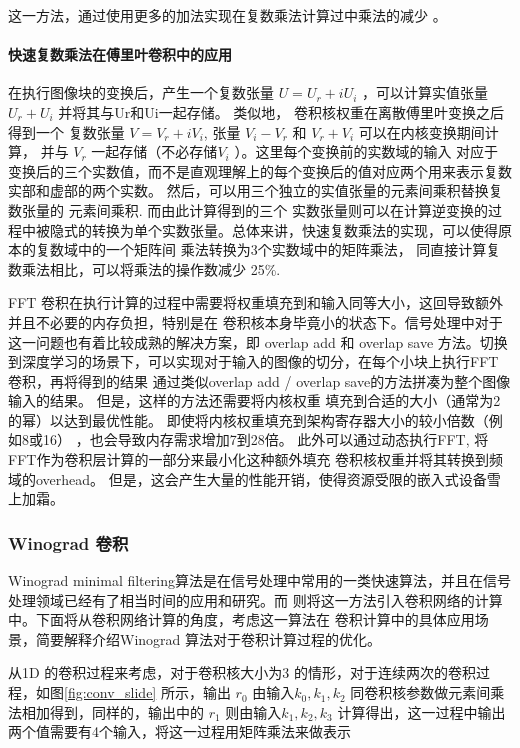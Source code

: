 这一方法，通过使用更多的加法实现在复数乘法计算过中乘法的减少 。

\paragraph{快速复数乘法在傅里叶卷积中的应用}

在执行图像块的变换后，产生一个复数张量 $U = U_r + i U_i$ ，可以计算实值张量 $U_r + U_i$ 并将其与Ur和Ui一起存储。 类似地， 卷积核权重在离散傅里叶变换之后得到一个
复数张量 $V = V_r + i V_i $, 张量 $V_i - V_r$ 和 $V_r + V_i$ 可以在内核变换期间计算， 并与 $V_r$ 一起存储（不必存储$V_i$ ）。这里每个变换前的实数域的输入
对应于变换后的三个实数值，而不是直观理解上的每个变换后的值对应两个用来表示复数实部和虚部的两个实数。 然后，可以用三个独立的实值张量的元素间乘积替换复数张量的
元素间乘积. 而由此计算得到的三个 实数张量则可以在计算逆变换的过程中被隐式的转换为单个实数张量。总体来讲，快速复数乘法的实现，可以使得原本的复数域中的一个矩阵间
乘法转换为3个实数域中的矩阵乘法， 同直接计算复数乘法相比，可以将乘法的操作数减少 25\%.

FFT 卷积在执行计算的过程中需要将权重填充到和输入同等大小，这回导致额外并且不必要的内存负担，特别是在
卷积核本身毕竟小的状态下。信号处理中对于这一问题也有着比较成熟的解决方案，即 overlap add 和 overlap save
方法。切换到深度学习的场景下，可以实现对于输入的图像的切分，在每个小块上执行FFT 卷积，再将得到的结果
通过类似overlap add / overlap save的方法拼凑为整个图像输入的结果。 但是，这样的方法还需要将内核权重
填充到合适的大小（通常为2的幂）以达到最优性能。 即使将内核权重填充到架构寄存器大小的较小倍数（例如8或16）
，也会导致内存需求增加7到28倍。 此外可以通过动态执行FFT, 将FFT作为卷积层计算的一部分来最小化这种额外填充
卷积核权重并将其转换到频域的overhead。 但是，这会产生大量的性能开销，使得资源受限的嵌入式设备雪上加霜。


\subsubsection{Winograd 卷积}

Winograd minimal filtering算法是在信号处理中常用的一类快速算法，并且在信号处理领域已经有了相当时间的应用和研究。而
\cite{Lavin2015FastAF} 则将这一方法引入卷积网络的计算中。下面将从卷积网络计算的角度，考虑这一算法在
卷积计算中的具体应用场景，简要解释介绍Winograd 算法对于卷积计算过程的优化。

从1D 的卷积过程来考虑，对于卷积核大小为3 的情形，对于连续两次的卷积过程，如图\ref{fig:conv_slide}
所示，输出 $r_0$ 由输入$k_0, k_1, k_2$ 同卷积核参数做元素间乘法相加得到，同样的，输出中的 $r_1$ 
则由输入$k_1, k_2, k_3$ 计算得出，这一过程中输出两个值需要有4个输入，将这一过程用矩阵乘法来做表示

